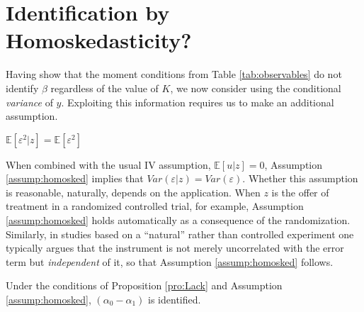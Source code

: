 \section{Identification by Homoskedasticity?}
Having show that the moment conditions from Table \ref{tab:observables} do not identify $\beta$ regardless of the value of $K$, we now consider using the conditional \emph{variance} of $y$.
Exploiting this information requires us to make an additional assumption.
\begin{assump}[Homoskedasticity]
  $\mathbb{E}[\varepsilon^2|z]=\mathbb{E}[\varepsilon^2]$
  \label{assump:homosked}
\end{assump}
When combined with the usual IV assumption, $\mathbb{E}[u|z]=0$, Assumption \ref{assump:homosked} implies that $Var(\varepsilon|z) = Var(\varepsilon)$.
Whether this assumption is reasonable, naturally, depends on the application.
When $z$ is the offer of treatment in a randomized controlled trial, for example, Assumption \ref{assump:homosked} holds automatically as a consequence of the randomization.
Similarly, in studies based on a ``natural'' rather than controlled experiment one typically argues that the instrument is not merely uncorrelated with the error term but \emph{independent} of it, so that Assumption \ref{assump:homosked} follows.
\begin{pro}
  \label{pro:homosked}
  Under the conditions of Proposition \ref{pro:Lack} and Assumption \ref{assump:homosked}, $(\alpha_0 - \alpha_1)$ is identified. 
\end{pro}
